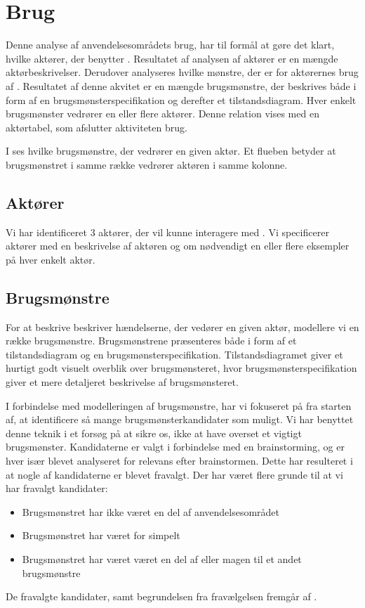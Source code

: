 \section{Brug}
\label{sec:brug}
Denne analyse af anvendelsesområdets brug, har til formål at gøre det klart, hvilke aktører, der benytter \Foodl. Resultatet af analysen af aktører er en mængde aktørbeskrivelser. Derudover analyseres hvilke mønstre, der er for aktørernes brug af \Foodl. Resultatet af denne akvitet er en mængde brugsmønstre, der beskrives både i form af en brugsmønsterspecifikation og derefter et tilstandsdiagram. Hver enkelt brugsmønster vedrører en eller flere aktører. Denne relation vises med en aktørtabel, som afslutter aktiviteten brug.

I  ses hvilke brugsmønstre, der vedrører en given aktør. Et flueben betyder at brugsmønstret i samme række vedrører aktøren i samme kolonne.



\subsection{Aktører}
\label{sec:aktoerer}
Vi har identificeret 3 aktører, der vil kunne interagere med \Foodl. Vi specificerer aktører med en beskrivelse af aktøren og om nødvendigt en eller flere eksempler på hver enkelt aktør.



\subsection{Brugsmønstre}
\label{subsec:brugsmoenstre}
For at beskrive beskriver hændelserne, der vedører en given aktør, modellere vi en række brugsmønstre. Brugsmønstrene præsenteres både i form af et tilstandsdiagram og en brugsmønsterspecifikation. Tilstandsdiagramet giver et hurtigt godt visuelt overblik over brugsmønsteret, hvor brugsmønsterspecifikation giver et mere detaljeret beskrivelse af brugsmønsteret.

I forbindelse med modelleringen af brugsmønstre, har vi fokuseret på fra starten af, at identificere så mange brugsmønsterkandidater som muligt. Vi har benyttet denne teknik i et forsøg på at sikre os, ikke at have overset et vigtigt brugsmønster. Kandidaterne er valgt i forbindelse med en brainstorming, og er hver især blevet analyseret for relevans efter brainstormen. Dette har resulteret i at nogle af kandidaterne er blevet fravalgt. Der har været flere grunde til at vi har fravalgt kandidater:
\begin{itemize}
\item Brugsmønstret har ikke været en del af anvendelsesområdet
\item Brugsmønstret har været for simpelt
\item Brugsmønstret har været været en del af eller magen til et andet brugsmønstre
\end{itemize}
De fravalgte kandidater, samt begrundelsen fra fravælgelsen fremgår af .








